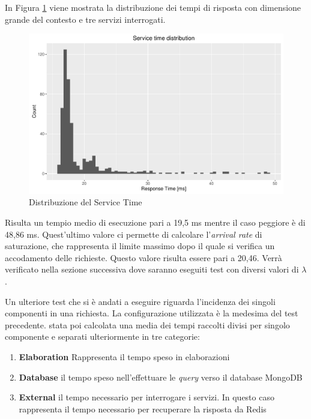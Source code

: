 In Figura \ref{fig:service-time-distribution} viene mostrata la distribuzione dei tempi di risposta con dimensione grande del contesto e tre servizi interrogati.

\begin{figure}[ht]
	\centering
	\includegraphics[width=\textwidth]{7-performance/Immagini/service_time_distribution.pdf}
	\caption{Distribuzione del Service Time}\label{fig:service-time-distribution}
\end{figure}

Risulta un tempio medio di esecuzione pari a 19,5 ms mentre il caso peggiore è di 48,86 ms. Quest'ultimo valore ci permette di calcolare l'\emph{arrival rate} di saturazione, che rappresenta il limite massimo dopo il quale si verifica un accodamento delle richieste. Questo valore risulta essere pari a 20,46. Verrà verificato nella sezione successiva dove saranno eseguiti test con diversi valori di $ \lambda $.

Un ulteriore test che si è andati a eseguire riguarda l'incidenza dei singoli componenti in una richiesta. La configurazione utilizzata è la medesima del test precedente. \upe stata poi calcolata una media dei tempi raccolti divisi per singolo componente e separati ulteriormente in tre categorie:

\begin{enumerate}
	\item \textbf{Elaboration}
	Rappresenta il tempo speso in elaborazioni
	\item \textbf{Database}
	\upe il tempo speso nell'effettuare le \emph{query} verso il database MongoDB
	\item \textbf{External}
	\upe il tempo necessario per interrogare i servizi. In questo caso rappresenta il tempo necessario per recuperare la risposta da Redis
\end{enumerate}

